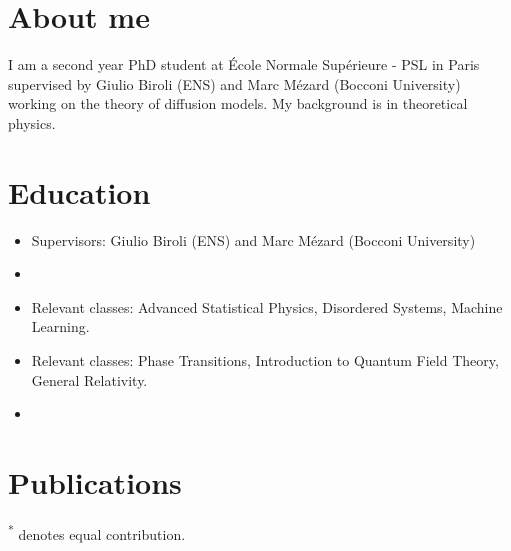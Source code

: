 \documentclass[11pt,a4paper,sans]{moderncv}        %
\begin{document}
\makecvtitle



\section{About me}
I am a second year PhD student at École Normale Supérieure - PSL in Paris supervised by Giulio Biroli (ENS) and Marc Mézard (Bocconi University) working on the theory of diffusion models. My background is in theoretical physics.
\section{Education}


\begin{itemize}
\item{}
Supervisors: Giulio Biroli (ENS) and Marc Mézard (Bocconi University)
\item{}

\item{}
Relevant classes: Advanced Statistical Physics, Disordered Systems, Machine Learning.
\item{}
Relevant classes: Phase Transitions, Introduction to Quantum Field Theory, General Relativity.
\item{}


\end{itemize}






\section{Publications}
\textsuperscript{*} denotes equal contribution.
\end{document}
